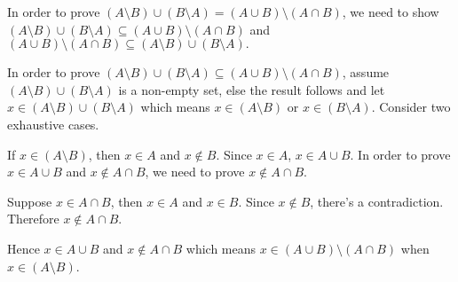 \documentclass[11pt]{article}
\begin{document}
\begin{enumerate}
\bigskip
In order to prove $(A \setminus B) \cup (B \setminus A) = (A \cup B) \setminus (A \cap B)$, we need to show $(A \setminus B) \cup (B \setminus A) \subseteq (A \cup B) \setminus (A \cap B)$ and  $(A \cup B) \setminus (A \cap B) \subseteq (A \setminus B) \cup (B \setminus A).$
\begin{addmargin}[2em]{0em}
	In order to prove $(A \setminus B) \cup (B \setminus A) \subseteq (A \cup B) \setminus (A \cap B)$, assume $(A \setminus B) \cup (B \setminus A)$ is a non-empty set, else the result follows and let $x \in (A \setminus B) \cup (B \setminus A)$ which means $x \in (A \setminus B)$ or $x \in (B \setminus A)$. Consider two exhaustive cases.
	\begin{addmargin}[2em]{0em}
		If $x \in (A \setminus B)$, then $x \in A$ and $x \notin B$. Since $x \in A$, $x \in A \cup B$. In order to prove $x \in A \cup B$ and $x \notin A \cap B$, we need to prove $x \notin A \cap B$.
		\begin{addmargin}[2em]{0em}
			Suppose $x \in A \cap B$, then $x \in A$ and $x \in B$. Since $x \notin B$, there's a contradiction. Therefore $x \notin A \cap B$.
		\end{addmargin}
		Hence $x \in A \cup B$ and $x \notin A \cap B$ which means $x \in (A \cup B) \setminus (A \cap B)$ when $x \in (A \setminus B)$.
		

\end{addmargin}
\end{addmargin}
\end{enumerate}
\end{document}
